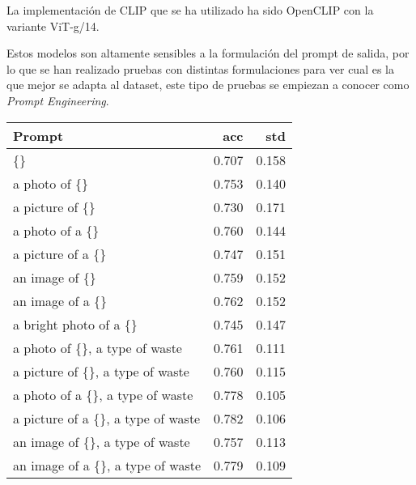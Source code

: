 \documentclass[10pt,a4paper,twocolumn,twoside]{article}
\begin{document}
La implementación de CLIP que se ha utilizado ha sido OpenCLIP con la variante ViT-g/14.

Estos modelos son altamente sensibles a la formulación del prompt de salida, por lo que se han realizado pruebas con distintas formulaciones para ver cual es la que mejor se adapta al dataset, este tipo
de pruebas se empiezan a conocer como \textit{Prompt Engineering}.

\begin{table}[h]
  \centering
  \begin{tabular}{@{}lrr@{}}
  \toprule
  \textbf{Prompt}                                                 & \textbf{acc}              & \textbf{std}              \\ \midrule
  \{\}                                                   & 0.707          & 0.158          \\
  \midrule
  a photo of \{\}                                        & 0.753          & 0.140          \\
  a picture of \{\}                                      & 0.730          & 0.171          \\
  a photo of a \{\}                                      & 0.760           & 0.144          \\
  a picture of a \{\}                                    & 0.747          & 0.151          \\
  an image of \{\}                                       & 0.759          & 0.152          \\
  an image of a \{\}                                     & 0.762           & 0.152          \\
  a bright photo of a \{\}                               & 0.745          & 0.147          \\ 
  \midrule
  a photo of \{\}, a type of waste                       & 0.761          & 0.111          \\
  a picture of \{\}, a type of waste                     & 0.760          & 0.115          \\
  a photo of a \{\}, a type of waste                     & 0.778          & 0.105          \\
  a picture of a \{\}, a type of waste                   & 0.782          & 0.106          \\
  an image of \{\}, a type of waste                      & 0.757          & 0.113          \\
  an image of a \{\}, a type of waste                    & 0.779          & 0.109          \\

\end{tabular}
\end{table}
\end{document}
